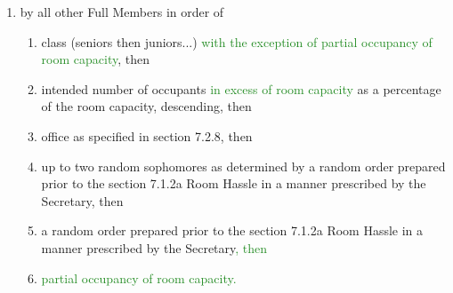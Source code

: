 \documentclass[10pt]{article} %
\begin{document}
\begin{itemize}
\begin{enumerate}[label=(\alph*)]
		\item by all other Full Members in order of 
		\begin{enumerate}[label=(\roman*)]
			\item class (seniors then juniors...) \textcolor{ForestGreen}{with the exception of partial occupancy of room capacity}, then 
			\item intended number of occupants \textcolor{ForestGreen}{in excess of room capacity} as a percentage of the room capacity, descending, then 
			\item office as specified in section 7.2.8, then 
			\item up to two random sophomores as determined by a random order prepared prior to the section 7.1.2a Room Hassle in a manner prescribed by the Secretary, then 
			\item a random order prepared prior to the section 7.1.2a Room Hassle in a manner prescribed by the Secretary\textcolor{ForestGreen}{, then}
			\item \textcolor{ForestGreen}{partial occupancy of room capacity.}
		\end{enumerate}
	\end{enumerate}
\end{itemize}
\end{document}
